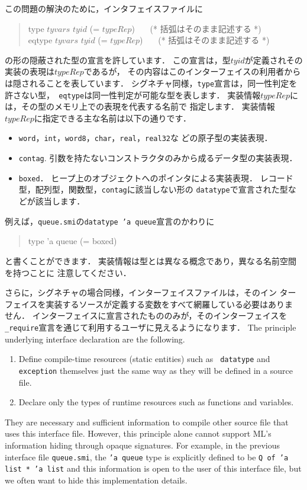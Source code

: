 \documentclass{jbook}
\newenvironment{program}{\begin{quote}\begin{tt}}%
                        {\end{tt}\end{quote}}
\begin{document}
	この問題の解決のために，インタフェイスファイルに
\begin{program}
type $tyvars$ $tyid$ (= $typeRep$) \ \ \ (* 括弧はそのまま記述する *)\\
eqtype $tyvars$ $tyid$ (= $typeRep$) \ \ \ (* 括弧はそのまま記述する *)
\end{program}
の形の隠蔽された型の宣言を許しています．
	この宣言は，型$tyid$が定義されその実装の表現は$typeRep$であるが，
その内容はこのインターフェイスの利用者からは隠されることを表しています．
	シグネチャ同様，{\tt type}宣言は，同一性判定を許さない型，{\tt
eqtype}は同一性判定が可能な型を表します．
	実装情報$typeRep$には，その型のメモリ上での表現を代表する名前で
指定します．
	実装情報$typeRep$に指定できる主な名前は以下の通りです．
\begin{itemize}
\item
{\tt word}，{\tt int}，{\tt word8}，{\tt char}，{\tt real}，{\tt real32}な
どの原子型の実装表現．
\item {\tt contag}.
	引数を持たないコンストラクタのみから成るデータ型の実装表現．
\item {\tt boxed}．
	ヒープ上のオブジェクトへのポインタによる実装表現．
	レコード型，配列型，関数型，{\tt contag}に該当しない形の
{\tt datatype}で宣言された型などが該当します．
\end{itemize}
	例えば，{\tt queue.smi}の{\tt datatype 'a queue}宣言のかわりに
\begin{program}
type 'a queue (= boxed)
\end{program}
と書くことができます．
	実装情報は型とは異なる概念であり，異なる名前空間を持つことに
注意してください．

	さらに，シグネチャの場合同様，インターフェイスファイルは，そのイン
ターフェイスを実装するソースが定義する変数をすべて網羅している必要はありま
せん．
	インターフェイスに宣言されたもののみが，そのインターフェイスを{\tt
\_require}宣言を通じて利用するユーザに見えるようになります．
\else%
	The principle underlying interface declaration are the
following.
\begin{enumerate}
\item 
	Define compile-time resources (static entities) such as {\tt
datatype} and {\tt exception} themselves just the same way as they will
be defined in a source file.
\item 
	Declare only the types of runtime resources such as functions
and variables.
\end{enumerate}
	They are necessary and sufficient information to compile other
source file that uses this interface file.
	However, this principle alone cannot support ML's information
hiding through opaque signatures.
	For example, in the previous interface file {\tt queue.smi},
the {\tt 'a queue} type is explicitly defined to be {\tt Q of 'a list *
'a list} and this information is open to the user of this interface
file, but we often want to hide this implementation details.
\end{document}
